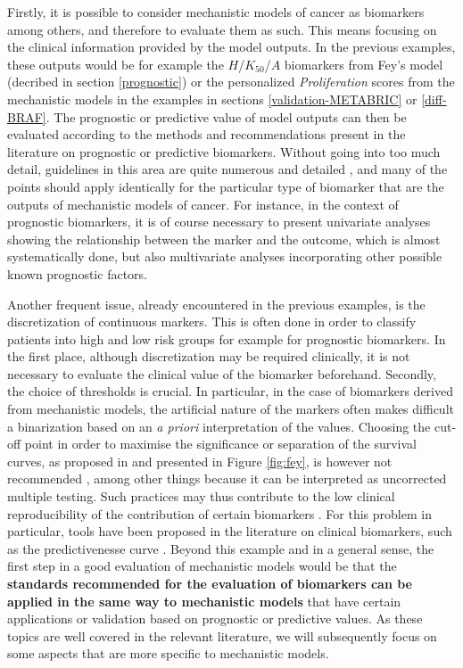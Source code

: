 \documentclass[a4paper,12pt,twoside,onecolumn,openright,final,oldfontcommands]{memoir}
\begin{document}
Firstly, it is possible to consider mechanistic models of cancer as
biomarkers among others, and therefore to evaluate them as such. This
means focusing on the clinical information provided by the model
outputs. In the previous examples, these outputs would be for example
the \(H\)/\(K_{50}\)/\(A\) biomarkers from Fey's model (decribed in
section \ref{prognostic}) or the personalized \emph{Proliferation}
scores from the mechanistic models in the examples in sections
\ref{validation-METABRIC} or \ref{diff-BRAF}. The prognostic or
predictive value of model outputs can then be evaluated according to the
methods and recommendations present in the literature on prognostic or
predictive biomarkers. Without going into too much detail, guidelines in
this area are quite numerous and detailed
\citep{mcshane2005reporting, sauerbrei2018reporting}, and many of the
points should apply identically for the particular type of biomarker
that are the outputs of mechanistic models of cancer. For instance, in
the context of prognostic biomarkers, it is of course necessary to
present univariate analyses showing the relationship between the marker
and the outcome, which is almost systematically done, but also
multivariate analyses incorporating other possible known prognostic
factors.

Another frequent issue, already encountered in the previous examples, is
the discretization of continuous markers. This is often done in order to
classify patients into high and low risk groups for example for
prognostic biomarkers. In the first place, although discretization may
be required clinically, it is not necessary to evaluate the clinical
value of the biomarker beforehand. Secondly, the choice of thresholds is
crucial. In particular, in the case of biomarkers derived from
mechanistic models, the artificial nature of the markers often makes
difficult a binarization based on an \emph{a priori} interpretation of
the values. Choosing the cut-off point in order to maximise the
significance or separation of the survival curves, as proposed in
\citet{fey2015signaling} and presented in Figure \ref{fig:fey}, is
however not recommended \citep{altman1994dangers}, among other things
because it can be interpreted as uncorrected multiple testing. Such
practices may thus contribute to the low clinical reproducibility of the
contribution of certain biomarkers \citep{hilsenbeck1992so}. For this
problem in particular, tools have been proposed in the literature on
clinical biomarkers, such as the predictivenesse curve
\citep{mboup2020evaluating}. Beyond this example and in a general sense,
the first step in a good evaluation of mechanistic models would be that
the \textbf{standards recommended for the evaluation of biomarkers can
be applied in the same way to mechanistic models} that have certain
applications or validation based on prognostic or predictive values. As
these topics are well covered in the relevant literature, we will
subsequently focus on some aspects that are more specific to mechanistic
models.
\end{document}
